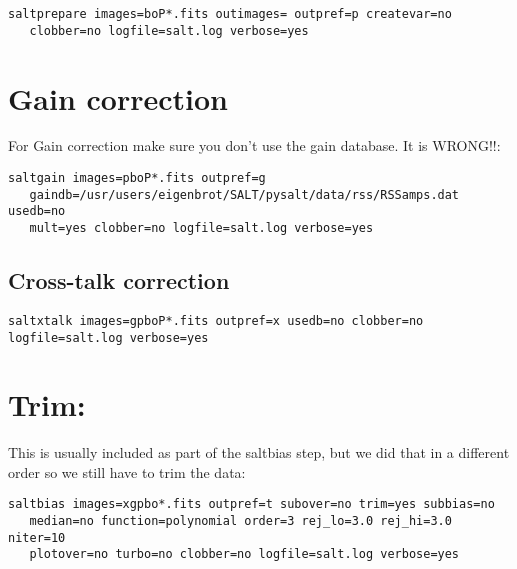 \documentclass[letter,11pt,oneside]{article}
\begin{document}
\begingroup \fontsize{10pt}{10pt}
\selectfont
\begin{verbatim} 
saltprepare images=boP*.fits outimages= outpref=p createvar=no
   clobber=no logfile=salt.log verbose=yes
\end{verbatim}
\endgroup

\section{Gain correction}

For Gain correction make sure you don't use the gain database. It is WRONG!!:

\begingroup \fontsize{10pt}{10pt}
\selectfont
\begin{verbatim} 
saltgain images=pboP*.fits outpref=g
   gaindb=/usr/users/eigenbrot/SALT/pysalt/data/rss/RSSamps.dat usedb=no
   mult=yes clobber=no logfile=salt.log verbose=yes
\end{verbatim}
\endgroup

\subsection{Cross-talk correction}

\begingroup \fontsize{10pt}{10pt}
\selectfont
\begin{verbatim} 
saltxtalk images=gpboP*.fits outpref=x usedb=no clobber=no logfile=salt.log verbose=yes
\end{verbatim}
\endgroup

\section{Trim:}

This is usually included as part of the saltbias step, but we did that
in a different order so we still have to trim the data:

\begingroup \fontsize{10pt}{10pt}
\selectfont
\begin{verbatim} 
saltbias images=xgpbo*.fits outpref=t subover=no trim=yes subbias=no
   median=no function=polynomial order=3 rej_lo=3.0 rej_hi=3.0 niter=10
   plotover=no turbo=no clobber=no logfile=salt.log verbose=yes
\end{verbatim}
\endgroup
\end{document}
